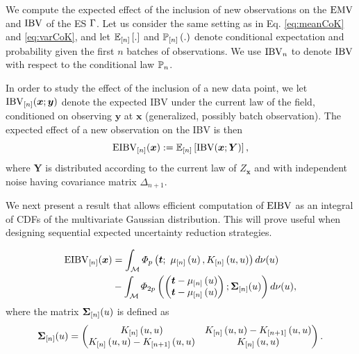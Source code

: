 \documentclass[aoas]{imsart}
\begin{document}
We compute the expected effect of the inclusion of new observations on
the $\operatorname{EMV}$ and $\operatorname{IBV}$ of the ES $\Gamma$. Let us consider the
same setting as in Eq. \eqref{eq:meanCoK} and \eqref{eq:varCoK}, and
let $\mathbb{E}_{[n]} \left[.\right]$ and $\mathbb{P}_{[n]} \left(.\right)$ denote conditional
expectation and probability given the first $n$ batches of observations. We use $\operatorname{IBV}_{n}$ to denote $\operatorname{IBV}$ with respect to the conditional law $\mathbb{P}_{n}$.

\medskip

In order to study the effect of the inclusion of a new data point, we
let $ \operatorname{IBV}_{[n]}(\bm{x}; \bm{y}) $ denote the expected IBV under the
current law of the field, conditioned on observing $\bm{y}$ at $\bm{x}$
(generalized, possibly batch observation). The expected effect of a
new observation on the IBV is then 
\begin{equation}\label{def:eibv}
    \currentEIBV(\bm{x}):=\currentExp{\mbox{IBV}(\bm{x}; \bm{Y})},
\end{equation}
where $\bm{Y}$ is distributed according to the current law of
$Z_{\bm{x}}$ and with independent noise having covariance matrix
$\Delta_{n+1}$.

We next present a result that allows efficient computation of $\operatorname{EIBV}$
as an integral of CDFs of the multivariate Gaussian distribution. This will prove
useful when designing sequential expected uncertainty reduction strategies.

\begin{propo}
\label{propo_eibv}
\begin{equation}
\begin{split}
\currentEIBV(\bm{x})
&=\int_{\domain} \varPhi_{\no}\left(\bt;~\currentMean{\uu}, \currentCov{u, u}\right) d\mes(u)\\
&-\int_{\domain} \varPhi_{2\no}
\left(
\left(
\begin{matrix}
\bt-\currentMean{u}\\
\bt-\currentMean{u}
\end{matrix}
\right);
\mathbf{\Sigma}_{[n]}(\uu)
\right)
d\mes(u),
\end{split}
\end{equation}
where the matrix $\mathbf{\Sigma}_{[n]}(u)$ is defined as
\begin{equation*}
\begin{split}
\mathbf{\Sigma}_{[n]}(\uu)&=
\left(
\begin{matrix}
\currentCov{u, u} & \currentCov{u, u}-\futureCov{u, u}\\
\currentCov{u, u}-\futureCov{u, u} & \currentCov{u, u}
\end{matrix}
\right).\\
\end{split}
\end{equation*}
\end{propo}
\end{document}
